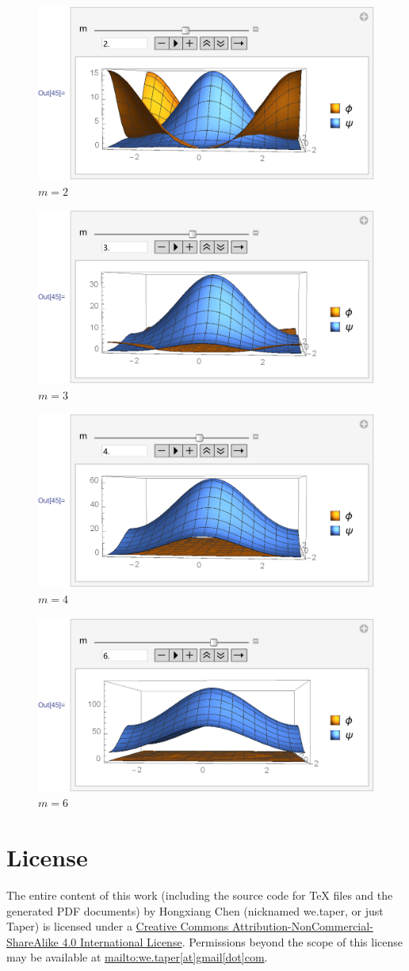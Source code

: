 \documentclass{article}
\begin{document}
\begin{figure}[H]
    \centering
    \includegraphics[width=0.6\linewidth]{pics/OpenBC-inXY/Eigen-m2.pdf}
    \caption{$m=2$}
\end{figure}
\begin{figure}[H]
    \centering
    \includegraphics[width=0.6\linewidth]{pics/OpenBC-inXY/Eigen-m3.pdf}
    \caption{$m=3$}
\end{figure}
\begin{figure}[H]
    \centering
    \includegraphics[width=0.6\linewidth]{pics/OpenBC-inXY/Eigen-m4.pdf}
    \caption{$m=4$}
\end{figure}
\begin{figure}[H]
    \centering
    \includegraphics[width=0.6\linewidth]{pics/OpenBC-inXY/Eigen-m6.pdf}
    \caption{$m=6$}
\end{figure}

\section{License}
The entire content of this work (including the source code
for TeX files and the generated PDF documents) by 
Hongxiang Chen (nicknamed we.taper, or just Taper) is
licensed under a 
\href{http://creativecommons.org/licenses/by-nc-sa/4.0/}{Creative 
Commons Attribution-NonCommercial-ShareAlike 4.0 International 
License}. Permissions beyond the scope of this 
license may be available at \url{mailto:we.taper[at]gmail[dot]com}.
\end{document}
